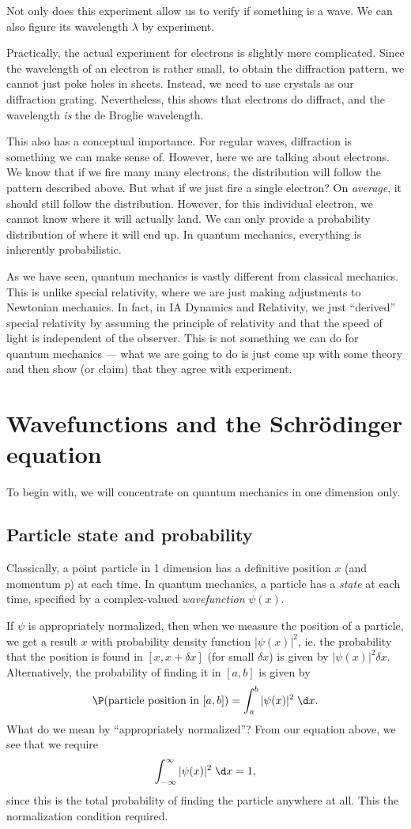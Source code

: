 \documentclass[a4paper]{article}
\begin{document}
Not only does this experiment allow us to verify if something is a wave. We can also figure its wavelength $\lambda$ by experiment.

Practically, the actual experiment for electrons is slightly more complicated. Since the wavelength of an electron is rather small, to obtain the diffraction pattern, we cannot just poke holes in sheets. Instead, we need to use crystals as our diffraction grating. Nevertheless, this shows that electrons do diffract, and the wavelength \emph{is} the de Broglie wavelength.

This also has a conceptual importance. For regular waves, diffraction is something we can make sense of. However, here we are talking about electrons. We know that if we fire many many electrons, the distribution will follow the pattern described above. But what if we just fire a single electron? On \emph{average}, it should still follow the distribution. However, for this individual electron, we cannot know where it will actually land. We can only provide a probability distribution of where it will end up. In quantum mechanics, everything is inherently probabilistic.

As we have seen, quantum mechanics is vastly different from classical mechanics. This is unlike special relativity, where we are just making adjustments to Newtonian mechanics. In fact, in IA Dynamics and Relativity, we just ``derived'' special relativity by assuming the principle of relativity and that the speed of light is independent of the observer. This is not something we can do for quantum mechanics --- what we are going to do is just come up with some theory and then show (or claim) that they agree with experiment.

\section{Wavefunctions and the Schr\"odinger equation}
To begin with, we will concentrate on quantum mechanics in one dimension only.

\subsection{Particle state and probability}
Classically, a point particle in 1 dimension has a definitive position $x$ (and momentum $p$) at each time. In quantum mechanics, a particle has a \emph{state} at each time, specified by a complex-valued \emph{wavefunction} $\psi(x)$.

If $\psi$ is appropriately normalized, then when we measure the position of a particle, we get a result $x$ with probability density function $|\psi(x)|^2$, ie. the probability that the position is found in $[x, x + \delta x]$ (for small $\delta x$) is given by $|\psi(x)|^2 \delta x$. Alternatively, the probability of finding it in $[a, b]$ is given by
\[
  \P(\text{particle position in }[a, b]) = \int_a^b |\psi(x)|^2 \;\d x.
\]
What do we mean by ``appropriately normalized''? From our equation above, we see that we require
\[
  \int_{-\infty}^\infty |\psi(x)|^2\;\d x = 1,
\]
since this is the total probability of finding the particle anywhere at all. This the normalization condition required.
\end{document}
